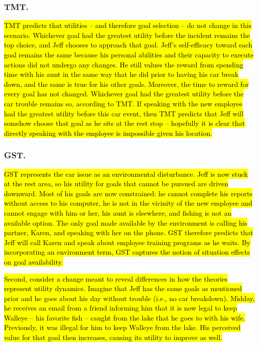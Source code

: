 \documentclass[english,,man]{apa6}
\theoremstyle{definition}
\theoremstyle{definition}
\theoremstyle{definition}
\theoremstyle{remark}
\begin{document}
\hypertarget{tmt.}{%
\subsubsection{TMT.}\label{tmt.}}

\hl{TMT predicts that utilities -- and therefore goal selection -- do not change in this scenario. Whichever goal had the greatest utility before the incident remains the top choice, and Jeff chooses to approach that goal. Jeff's self-efficacy toward each goal remains the same because his personal abilities and their capacity to execute actions did not undergo any changes. He still values the reward from spending time with his aunt in the same way that he did prior to having his car break down, and the same is true for his other goals. Moreover, the time to reward for every goal has not changed. Whichever goal had the greatest utility before the car trouble remains so, according to TMT. If speaking with the new employee had the greatest utility before this car event, then TMT predicts that Jeff will somehow choose that goal as he sits at the rest stop -- hopefully it is clear that directly speaking with the employee is impossible given his location. }

\hypertarget{gst.}{%
\subsubsection{GST.}\label{gst.}}

\hl{GST represents the car issue as an environmental disturbance. Jeff is now stuck at the rest area, so his utility for goals that cannot be pursued are driven downward. Most of his goals are now constrained: he cannot complete his reports without access to his computer, he is not in the vicinity of the new employee and cannot engage with him or her, his aunt is elsewhere, and fishing is not an available option. The only goal made available by the environment is calling his partner, Karen, and speaking with her on the phone. GST therefore predicts that Jeff will call Karen and speak about employee training programs as he waits. By incorporating an environment term, GST captures the notion of situation effects on goal availability.}

\hl{Second, consider a change meant to reveal differences in how the theories represent utility dynamics. Imagine that Jeff has the same goals as mentioned prior and he goes about his day without trouble (i.e., no car breakdown). Midday, he receives an email from a friend informing him that it is now legal to keep Walleye -- his favorite fish -- caught from the lake that he goes to with his wife. Previously, it was illegal for him to keep Walleye from the lake. His perceived value for that goal then increases, causing its utility to improve as well.}
\end{document}
